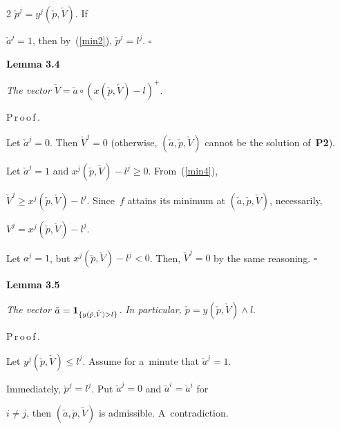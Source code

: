 \begin{multicols}{2}
$\check p^j = y^j(\check p,\check  V)$. If

 $\check a^j = 1$, then by~(\ref{min2}), $\check p^j = l^j$.  \hfill$\square$



\smallskip



\noindent

\textbf{Lemma 3.4}\

\textit{The vector}  $\check V = \check a \circ (x(\check  p,\check  V)-l)^+$.



\smallskip



\noindent

P\,r\,o\,o\,f\,.\ \

  Let $\check a^j = 0$. Then $\check V^j = 0$ (otherwise,  $(\check a, \check p, \check V)$ cannot be the solution of~\textbf{P2}). 



Let $\check a^j = 1$ and $x^j(\check  p,\check  V) - l^j \geq 0$. From~(\ref{min4}), 

$\check V^j \geq x^j(\check  p,\check  V) - l^j$. Since~$f$ attains its minimum at $(\check a, \check p,\check  V)$, necessarily, 

$V^j = x^j(\check  p,\check  V) - l^j$. 



Let $a^j = 1$, but $x^j(\check  p,\check  V) - l^j < 0$. Then, $\check V^j = 0$ by the same reasoning. \hfill$\square$



\smallskip



\noindent

\textbf{Lemma 3.5}\

\textit{The vector $\check a = {\bf 1}_{\{y(\check  p,\check  V) > l \} }$. In particular, $\check p = y(\check  p,\check  V) \wedge l$}.



\pagebreak



\noindent

P\,r\,o\,o\,f\,.\ \ 

Let $y^j (\check  p,\check  V)\leq l^j$.  Assume for a~minute that $\check a^j = 1$. 

Immediately, $\check p^j = l^j$. Put $\tilde a^j = 0$ and $\tilde a^i = \check a^i$ for

 $i \neq j$, then $(\tilde a, \check p, \check V)$ is admissible. A~contradiction. \\


\end{multicols}
